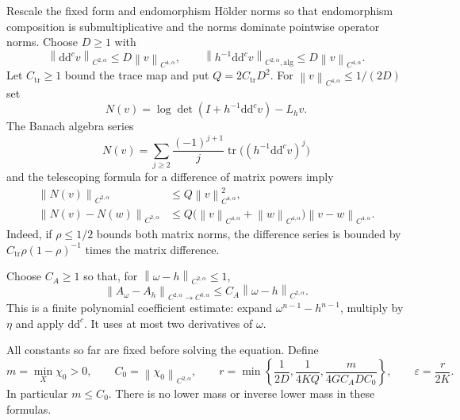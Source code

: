 \documentclass[11pt]{article}
\newcommand{\ddc}{\mathrm{d}\mathrm{d}^c}
\newcommand{\eps}{\varepsilon}
\newcommand{\norm}[1]{\left\|#1\right\|}
\begin{document}
Rescale the fixed form and endomorphism H\"older norms so that
endomorphism composition is submultiplicative and the norms dominate
pointwise operator norms. Choose $D\ge1$ with
\[
 \norm{\ddc v}_{C^{2,\alpha}}\le D\norm{v}_{C^{4,\alpha}},
 \qquad
 \norm{h^{-1}\ddc v}_{C^{2,\alpha},\mathrm{alg}}
                          \le D\norm{v}_{C^{4,\alpha}}.
\]
Let $C_{\mathrm{tr}}\ge1$ bound the trace map and put
$Q=2C_{\mathrm{tr}}D^2$. For $\norm{v}_{C^{4,\alpha}}\le1/(2D)$ set
\[
 N(v)=\log\det(I+h^{-1}\ddc v)-L_hv.
\]
The Banach algebra series
\[
 N(v)=\sum_{j\ge2}\frac{(-1)^{j+1}}j
                  \operatorname{tr}\bigl((h^{-1}\ddc v)^j\bigr)
\]
and the telescoping formula for a difference of matrix powers imply
\begin{align}
 \norm{N(v)}_{C^{2,\alpha}}&\le Q\norm{v}_{C^{4,\alpha}}^2,\label{eq:remainder}\\
 \norm{N(v)-N(w)}_{C^{2,\alpha}}
  &\le Q\bigl(\norm{v}_{C^{4,\alpha}}+
          \norm{w}_{C^{4,\alpha}}\bigr)\norm{v-w}_{C^{4,\alpha}}.
 \nonumber
\end{align}
Indeed, if $\rho\le1/2$ bounds both matrix norms, the difference
series is bounded by
$C_{\mathrm{tr}}\rho(1-\rho)^{-1}$ times the matrix difference.

Choose $C_A\ge1$ so that, for $\norm{\omega-h}_{C^{2,\alpha}}\le1$,
\[
 \norm{A_\omega-A_h}_{C^{2,\alpha}\to C^{0,\alpha}}
                         \le C_A\norm{\omega-h}_{C^{2,\alpha}}.
\]
This is a finite polynomial coefficient estimate: expand
$\omega^{n-1}-h^{n-1}$, multiply by $\eta$ and apply $\ddc$.
It uses at most two derivatives of $\omega$.

All constants so far are fixed before solving the equation. Define
\begin{equation}\label{eq:radius}
 m=\min_X\chi_0>0,\qquad C_0=\norm{\chi_0}_{C^{2,\alpha}},\qquad
 r=\min\left\{\frac1{2D},\frac1{4KQ},
                   \frac{m}{4GC_ADC_0}\right\},\qquad
 \eps=\frac r{2K}.
\end{equation}
In particular $m\le C_0$. There is no lower mass or inverse lower
mass in these formulas.
\end{document}
